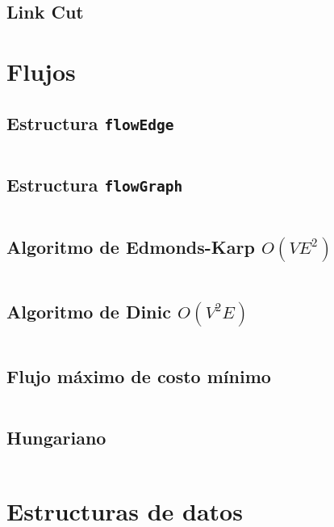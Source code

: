 \documentclass[11pt]{article}
\begin{document}
		
		\subsection{Link Cut}
		
		
	\newpage
	\section{Flujos}
		\subsection{Estructura \texttt{flowEdge}}
		\inputminted[tabsize=2,breaklines,firstline=4,lastline=17,fontsize=\small]{c++}{flow.cpp}
		
		\subsection{Estructura \texttt{flowGraph}}
		\inputminted[tabsize=2,breaklines,firstline=19,lastline=38,fontsize=\small]{c++}{flow.cpp}
		
		\subsection{Algoritmo de Edmonds-Karp $O(VE^2)$}
		\inputminted[tabsize=2,breaklines,firstline=82,lastline=108,fontsize=\small]{c++}{flow.cpp}
		
		\subsection{Algoritmo de Dinic $O(V^2E)$}
		\inputminted[tabsize=2,breaklines,firstline=40,lastline=80,fontsize=\small]{c++}{flow.cpp}
		
		\subsection{Flujo máximo de costo mínimo}
		\inputminted[tabsize=2,breaklines,firstline=110,lastline=145,fontsize=\small]{c++}{flow.cpp}
		
		\subsection{Hungariano}
		\inputminted[tabsize=2,breaklines,firstline=148,lastline=190,fontsize=\small]{c++}{flow.cpp}
		
	\newpage
	\section{Estructuras de datos}
\end{document}
